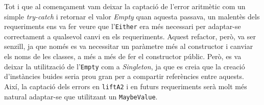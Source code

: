 
	Tot i que al començament vam deixar la captació de l'error aritmètic com un simple \textit{try-catch}
	i retornar el valor \textit{Empty} quan aquesta passava, un malentès dels requeriments ens va fer 
	veure que l'\texttt{Either} era més necessari per adaptar-se correctament a qualsevol canvi 
	en els requeriments. Aquest refactor, però, va ser senzill, ja que només 
	es va necessitar un paràmetre més al constructor i canviar els noms de les classes, 
	a més a més de fer el constructor públic. Però, es va deixar la utilització de l'\texttt{Empty}
	com a \textit{Singleton}, ja que es creia que la creació d'instàncies buides seria prou gran per a compartir
	referències entre aquests. Així, la captació dels errors en \texttt{liftA2} i en futurs requeriments serà molt
	més natural adaptar-se que utilitzant un \texttt{MaybeValue}.
